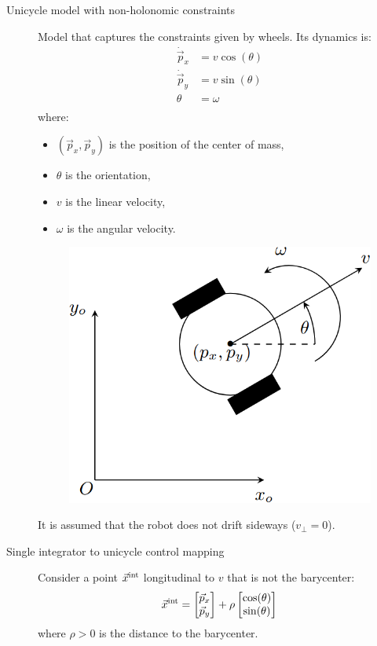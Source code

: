 \begin{description}
    \item[Unicycle model with non-holonomic constraints] 
        Model that captures the constraints given by wheels. Its dynamics is:
        \[
            \begin{split}
                \dot{\vec{p}}_x &= v \cos(\theta) \\
                \dot{\vec{p}}_y &= v \sin(\theta) \\
                \theta &= \omega \\
            \end{split}
        \]
        where:
        \begin{itemize}
            \item $(\vec{p}_x, \vec{p}_y)$ is the position of the center of mass,
            \item $\theta$ is the orientation,
            \item $v$ is the linear velocity,
            \item $\omega$ is the angular velocity.
        \end{itemize}

        \begin{figure}[H]
            \centering
            \includegraphics[width=0.25\linewidth]{./img/unicycle_model.png}
        \end{figure}

        \begin{remark}
            It is assumed that the robot does not drift sideways ($v_{\bot} = 0$).
        \end{remark}

    \item[Single integrator to unicycle control mapping] 
        Consider a point ${\vec{x}}^\text{int}$ longitudinal to $v$ that is not the barycenter:
        \[
            {\vec{x}}^\text{int} = \begin{bmatrix}
                \vec{p}_x \\ \vec{p}_y
            \end{bmatrix}
            +
            \rho \begin{bmatrix}
                \cos(\theta) \\ \sin(\theta)
            \end{bmatrix}
        \]
        where $\rho > 0$ is the distance to the barycenter.


\end{description}
